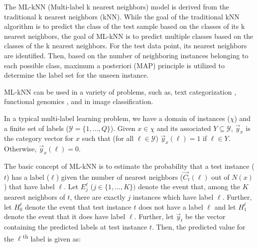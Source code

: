 \documentclass[11pt]{article}
\begin{document}
The ML-kNN (Multi-label k nearest neighbors) model is derived from the traditional k nearest neighbors (kNN). While the goal of the traditional kNN algorithm is to predict the class of the test sample based on the classes of its k nearest neighbors, the goal of ML-kNN is to predict multiple classes based on the classes of the k nearest neighbors. For the test data point, its nearest neighbors are identified. Then, based on the number of neighboring instances belonging to each possible class, maximum a posteriori (MAP) principle is utilized to determine the label set for the unseen instance. 


ML-kNN can be used in a variety of problems, such as, text categorization \autocite{McCallum99multi-labeltext}, functional genomics \autocite{KernelMulti-labelClassification}, and in image classification.\autocite{Boutell04learningmulti-label}

In a typical multi-label learning problem, we have a domain of instances ($\chi$)  and a finite set of labels ($\mathcal{Y} = \{1,...,Q\}$). Given $x \in \chi$ and its associated $Y \subseteq \mathcal{Y}$, $\vec{y}_x$ is the category vector for $x$ such that (for all $\ell \in \mathcal{Y}$) $\vec{y}_x(\ell) = 1$ if $\ell \in Y$. Otherwise, $\vec{y}_x(\ell) = 0$. 

The basic concept of ML-kNN is to estimate the probability that a test instance ($t$) has a label ($\ell$) given the number of nearest neighbors ($\vec{C}_t(\ell)$ out of $N(x)$) that have label $\ell$. Let $E_j^\ell$ ($j \in \{1,...,K\})$ denote the event that, among the $K$ nearest neighbors of $t$, there are exactly $j$ instances which have label $\ell$. Further, let $H_0^\ell$ denote the event that test instance $t$ does not have a label $\ell$ and let $H_1^\ell$ denote the event that it does have label $\ell$. 
Further, let $\vec{y}_t$ be the vector containing the predicted labels at test instance $t$. Then, the predicted value for the $\ell$\textsuperscript{th} label is given as:
\end{document}
